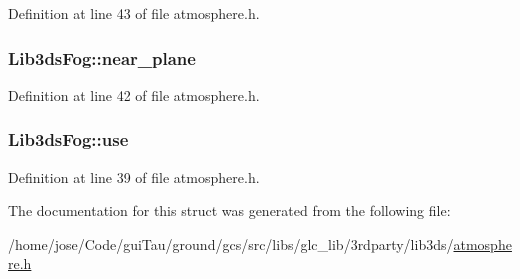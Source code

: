 Definition at line 43 of file atmosphere.\-h.

\hypertarget{struct_lib3ds_fog_a0a0f05b7d85f01efdb7b661dc939ae41}{
\subsubsection[{near\-\_\-plane}]{ Lib3ds\-Fog\-::near\-\_\-plane}}\label{struct_lib3ds_fog_a0a0f05b7d85f01efdb7b661dc939ae41}


Definition at line 42 of file atmosphere.\-h.

\hypertarget{struct_lib3ds_fog_acf9e0f4459111c8c232893cf244102ec}{
\subsubsection[{use}]{ Lib3ds\-Fog\-::use}}\label{struct_lib3ds_fog_acf9e0f4459111c8c232893cf244102ec}


Definition at line 39 of file atmosphere.\-h.



The documentation for this struct was generated from the following file\-:\begin{DoxyCompactItemize}
\item 
/home/jose/\-Code/gui\-Tau/ground/gcs/src/libs/glc\-\_\-lib/3rdparty/lib3ds/\hyperlink{atmosphere_8h}{atmosphere.\-h}\end{DoxyCompactItemize}
